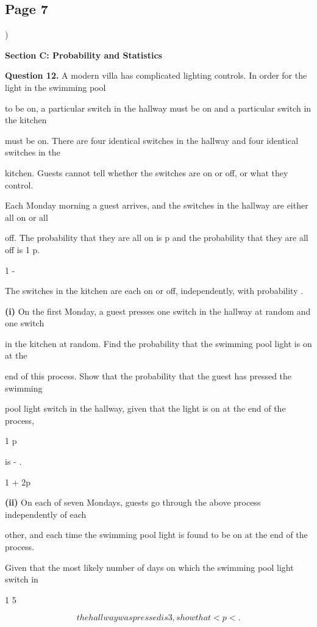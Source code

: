 \documentclass[12pt]{article}
\begin{document}
\subsection*{Page 7}
\begin{flushleft}
)\par
\bigskip\textbf{Section C: Probability and Statistics}\par
\bigskip\textbf{Question 12.} A modern villa has complicated lighting controls. In order for the light in the swimming pool\par
to be on, a particular switch in the hallway must be on and a particular switch in the kitchen\par
must be on. There are four identical switches in the hallway and four identical switches in the\par
kitchen. Guests cannot tell whether the switches are on or off, or what they control.\par
Each Monday morning a guest arrives, and the switches in the hallway are either all on or all\par
off. The probability that they are all on is p and the probability that they are all off is 1 p.\par
1 -\par
The switches in the kitchen are each on or off, independently, with probability .\par
\textbf{(i)} On the first Monday, a guest presses one switch in the hallway at random and one switch\par
in the kitchen at random. Find the probability that the swimming pool light is on at the\par
end of this process. Show that the probability that the guest has pressed the swimming\par
pool light switch in the hallway, given that the light is on at the end of the process,\par
1 p\par
is - .\par
1 + 2p\par
\textbf{(ii)} On each of seven Mondays, guests go through the above process independently of each\par
other, and each time the swimming pool light is found to be on at the end of the process.\par
Given that the most likely number of days on which the swimming pool light switch in\par
1 5\par
\[the hallway was pressed is 3, show that < p < .\]

\end{flushleft}
\end{document}
